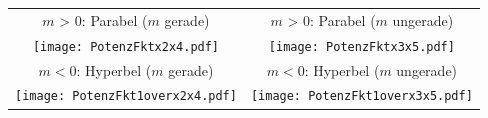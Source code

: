 \begin{tabular}{cc}
$m$ > 0: Parabel ($m$ gerade) & $m$ > 0: Parabel ($m$ ungerade)\\   %
  \texttt{[image: PotenzFktx2x4.pdf]} &
  \texttt{[image: PotenzFktx3x5.pdf]}\\

$m<0$: Hyperbel  ($m$ gerade) & $m<0$: Hyperbel ($m$ ungerade)\\
  \texttt{[image: PotenzFkt1overx2x4.pdf]}&
  \texttt{[image: PotenzFkt1overx3x5.pdf]}
  \end{tabular}



\newpage

